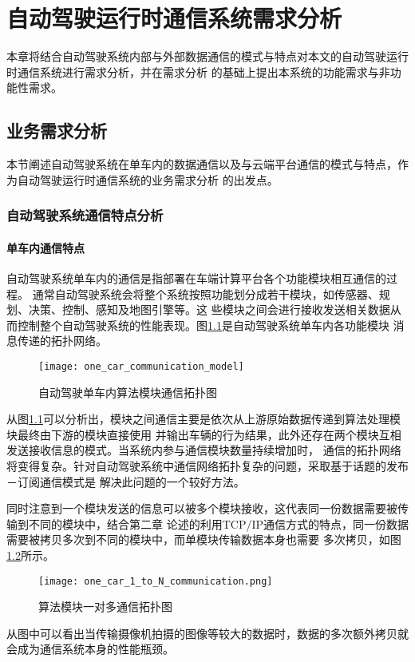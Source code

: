 \chapter{自动驾驶运行时通信系统需求分析}
本章将结合自动驾驶系统内部与外部数据通信的模式与特点对本文的自动驾驶运行时通信系统进行需求分析，并在需求分析
的基础上提出本系统的功能需求与非功能性需求。
\section{业务需求分析}
本节阐述自动驾驶系统在单车内的数据通信以及与云端平台通信的模式与特点，作为自动驾驶运行时通信系统的业务需求分析
的出发点。
\subsection{自动驾驶系统通信特点分析}
\subsubsection{单车内通信特点}
自动驾驶系统单车内的通信是指部署在车端计算平台各个功能模块相互通信的过程。
通常自动驾驶系统会将整个系统按照功能划分成若干模块，如传感器、规划、决策、控制、感知及地图引擎等。这
些模块之间会进行接收发送相关数据从而控制整个自动驾驶系统的性能表现。图\ref{one_car_communication_model}是自动驾驶系统单车内各功能模块
消息传递的拓扑网络。
\begin{figure}[H]
  \centering
  \texttt{[image: one\_car\_communication\_model]}
  \caption{自动驾驶单车内算法模块通信拓扑图}
  \label{one_car_communication_model}
\end{figure}
从图\ref{one_car_communication_model}可以分析出，模块之间通信主要是依次从上游原始数据传递到算法处理模块最终由下游的模块直接使用
并输出车辆的行为结果，此外还存在两个模块互相发送接收信息的模式。当系统内参与通信模块数量持续增加时，
通信的拓扑网络将变得复杂。针对自动驾驶系统中通信网络拓扑复杂的问题，采取基于话题的发布－订阅通信模式是
解决此问题的一个较好方法。

同时注意到一个模块发送的信息可以被多个模块接收，这代表同一份数据需要被传输到不同的模块中，结合第二章
论述的利用TCP/IP通信方式的特点，同一份数据需要被拷贝多次到不同的模块中，而单模块传输数据本身也需要
多次拷贝，如图\ref{one_car_1_to_N_communication}所示。
\begin{figure}[H]
  \centering
  \texttt{[image: one\_car\_1\_to\_N\_communication.png]}
  \caption{算法模块一对多通信拓扑图}
  \label{one_car_1_to_N_communication}
\end{figure}
从图中可以看出当传输摄像机拍摄的图像等较大的数据时，数据的多次额外拷贝就会成为通信系统本身的性能瓶颈。
